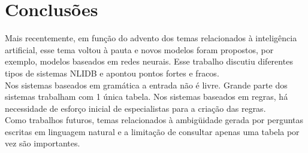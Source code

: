 \documentclass{article}
\begin{document}

\section{Conclusões\label{conclusoes}}

Mais recentemente, em função do advento dos temas relacionados à inteligência artificial, esse tema voltou à pauta e novos modelos foram propostos, por exemplo, modelos baseados em redes neurais. Esse trabalho discutiu diferentes tipos de sistemas NLIDB e apontou pontos fortes e fracos.\\

Nos sistemas baseados em gramática a entrada não é livre. Grande parte dos sistemas trabalham com 1 única tabela. Nos sistemas baseados em regras, há necessidade de esforço inicial de especialistas para a criação das regras.\\

Como trabalhos futuros, temas relacionados à ambigüidade gerada por perguntas escritas em linguagem natural e a limitação de consultar apenas uma tabela por vez são importantes.\\










\end{document}

